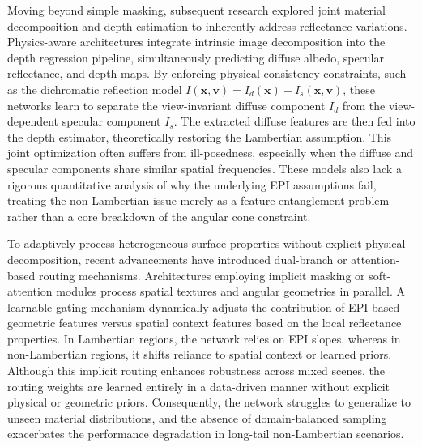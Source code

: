 Moving beyond simple masking, subsequent research explored joint material decomposition and depth estimation to inherently address reflectance variations. Physics-aware architectures integrate intrinsic image decomposition into the depth regression pipeline, simultaneously predicting diffuse albedo, specular reflectance, and depth maps. By enforcing physical consistency constraints, such as the dichromatic reflection model $I(\mathbf{x}, \mathbf{v}) = I_d(\mathbf{x}) + I_s(\mathbf{x}, \mathbf{v})$, these networks learn to separate the view-invariant diffuse component $I_d$ from the view-dependent specular component $I_s$. The extracted diffuse features are then fed into the depth estimator, theoretically restoring the Lambertian assumption. This joint optimization often suffers from ill-posedness, especially when the diffuse and specular components share similar spatial frequencies. These models also lack a rigorous quantitative analysis of why the underlying EPI assumptions fail, treating the non-Lambertian issue merely as a feature entanglement problem rather than a core breakdown of the angular cone constraint.

To adaptively process heterogeneous surface properties without explicit physical decomposition, recent advancements have introduced dual-branch or attention-based routing mechanisms. Architectures employing implicit masking or soft-attention modules process spatial textures and angular geometries in parallel. A learnable gating mechanism dynamically adjusts the contribution of EPI-based geometric features versus spatial context features based on the local reflectance properties. In Lambertian regions, the network relies on EPI slopes, whereas in non-Lambertian regions, it shifts reliance to spatial context or learned priors. Although this implicit routing enhances robustness across mixed scenes, the routing weights are learned entirely in a data-driven manner without explicit physical or geometric priors. Consequently, the network struggles to generalize to unseen material distributions, and the absence of domain-balanced sampling exacerbates the performance degradation in long-tail non-Lambertian scenarios.

